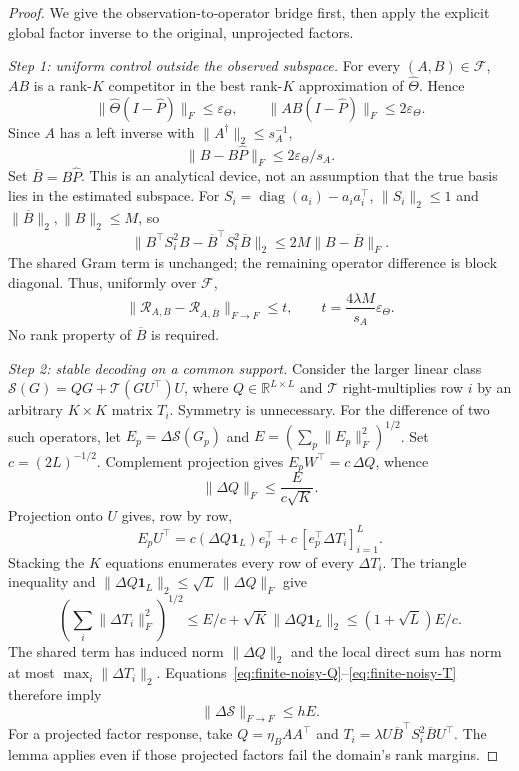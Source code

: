 \begin{proof}
We give the observation-to-operator bridge first, then apply the explicit
global factor inverse to the original, unprojected factors.

\emph{Step 1: uniform control outside the observed subspace.}
For every $(A,B)\in\mathcal F$, $AB$ is a rank-$K$ competitor in the best
rank-$K$ approximation of $\widehat\Theta$. Hence
\[
 \|\widehat\Theta(I-\widehat P)\|_F\le\varepsilon_\Theta,
 \qquad
 \|AB(I-\widehat P)\|_F\le2\varepsilon_\Theta.
\]
Since $A$ has a left inverse with $\|A^\dagger\|_2\le s_A^{-1}$,
\begin{equation}
 \|B-B\widehat P\|_F\le2\varepsilon_\Theta/s_A.
 \label{eq:finite-noisy-tail}
\end{equation}
Set $\overline B=B\widehat P$. This is an analytical device, not an
assumption that the true basis lies in the estimated subspace.
For $S_i=\operatorname{diag}(a_i)-a_i a_i^\top$,
$\|S_i\|_2\le1$ and $\|\overline B\|_2,\|B\|_2\le M$, so
\[
 \|B^\top S_i^2B-\overline B^\top S_i^2\overline B\|_2
 \le2M\|B-\overline B\|_F.
\]
The shared Gram term is unchanged; the remaining operator difference
is block diagonal. Thus, uniformly over $\mathcal F$,
\begin{equation}
 \|\mathcal R_{A,B}-\mathcal R_{A,\overline B}\|_{F\to F}
 \le t,\qquad t=\frac{4\lambda M}{s_A}\varepsilon_\Theta.
 \label{eq:finite-noisy-compression}
\end{equation}
No rank property of $\overline B$ is required.

\emph{Step 2: stable decoding on a common support.}
Consider the larger linear class
$\mathcal S(G)=QG+\mathcal T(GU^\top)U$,
where $Q\in\mathbb R^{L\times L}$ and $\mathcal T$ right-multiplies row $i$
by an arbitrary $K\times K$ matrix $T_i$. Symmetry is unnecessary.
For the difference of two such operators, let
$E_p=\Delta\mathcal S(G_p)$ and
$E=(\sum_p\|E_p\|_F^2)^{1/2}$.
Set $c=(2L)^{-1/2}$. Complement projection gives
$E_pW^\top=c\,\Delta Q$, whence
\begin{equation}
 \|\Delta Q\|_F\le\frac{E}{c\sqrt K}.
 \label{eq:finite-noisy-Q}
\end{equation}
Projection onto $U$ gives, row by row,
\[
 E_pU^\top
 =c(\Delta Q\mathbf1_L)e_p^\top
   +c\,[e_p^\top\Delta T_i]_{i=1}^L.
\]
Stacking the $K$ equations enumerates every row of every $\Delta T_i$.
The triangle inequality and
$\|\Delta Q\mathbf1_L\|_2\le\sqrt L\,\|\Delta Q\|_F$ give
\begin{equation}
 \left(\sum_i\|\Delta T_i\|_F^2\right)^{1/2}
 \le E/c+\sqrt K\|\Delta Q\mathbf1_L\|_2
 \le (1+\sqrt L)E/c.
 \label{eq:finite-noisy-T}
\end{equation}
The shared term has induced norm $\|\Delta Q\|_2$ and the local
direct sum has norm at most $\max_i\|\Delta T_i\|_2$.
Equations~\ref{eq:finite-noisy-Q}--\ref{eq:finite-noisy-T} therefore imply
\begin{equation}
 \|\Delta\mathcal S\|_{F\to F}\le h E.
 \label{eq:finite-noisy-norming}
\end{equation}
For a projected factor response, take $Q=\eta_BAA^\top$ and
$T_i=\lambda U\overline B^\top S_i^2\overline B U^\top$.
The lemma applies even if those projected factors fail the domain's
rank margins.


\end{proof}
